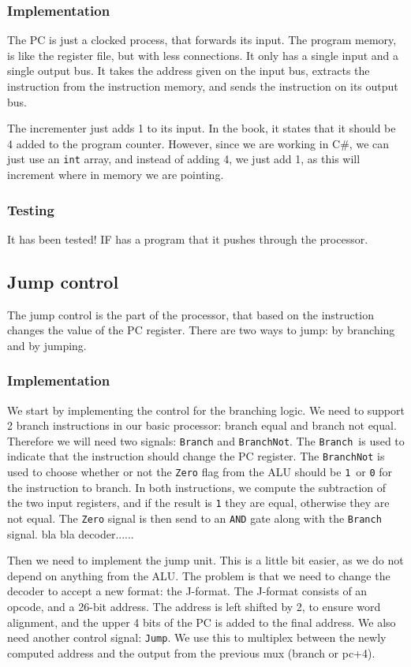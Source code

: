 \subsubsection*{Implementation}
The PC is just a clocked process, that forwards its input. The program memory,
is like the register file, but with less connections. It only has a single
input and a single output bus. It takes the address given on the input bus,
extracts the instruction from the instruction memory, and sends the instruction
on its output bus.

The incrementer just adds 1 to its input. In the book, it states that it should
be 4 added to the program counter. However, since we are working in C\#, we can
just use an \texttt{int} array, and instead of adding 4, we just add 1, as this
will increment where in memory we are pointing.

\subsubsection*{Testing}
It has been tested! IF has a program that it pushes through the processor.

\subsection{Jump control}
The jump control is the part of the processor, that based on the instruction
changes the value of the PC register. There are two ways to jump: by branching
and by jumping.

\subsubsection*{Implementation}
We start by implementing the control for the branching logic. We need to
support 2 branch instructions in our basic processor: branch equal and branch
not equal. Therefore we will need two signals: \texttt{Branch} and
\texttt{BranchNot}. The \texttt{Branch} is used to indicate that the
instruction should change the PC register. The \texttt{BranchNot} is used to
choose whether or not the \texttt{Zero} flag from the ALU should be
\texttt{1} or \texttt{0} for the instruction to branch. In both instructions,
we compute the subtraction of the two input registers, and if the result is
\texttt{1} they are equal, otherwise they are not equal. The \texttt{Zero}
signal is then send to an \texttt{AND} gate along with the \texttt{Branch}
signal. bla bla decoder......

Then we need to implement the jump unit. This is a little bit easier, as we do
not depend on anything from the ALU. The problem is that we need to change the
decoder to accept a new format: the J-format. The J-format consists of an
opcode, and a 26-bit address. The address is left shifted by 2, to ensure word
alignment, and the upper 4 bits of the PC is added to the final address. We
also need another control signal: \texttt{Jump}. We use this to multiplex
between the newly computed address and the output from the previous mux (branch
or pc+4).

